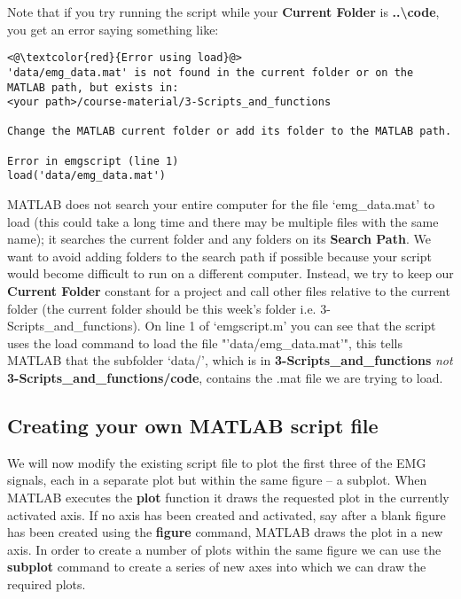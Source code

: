 \documentclass[12pt,a4paper]{article}
\begin{document}
Note that if you try running the script while your \textbf{Current Folder} is \textbf{..\textbackslash code}, you get an error saying something like:

\begin{lstlisting}[style=Matlab-editor]
<@\textcolor{red}{Error using load}@>
'data/emg_data.mat' is not found in the current folder or on the MATLAB path, but exists in:
<your path>/course-material/3-Scripts_and_functions

Change the MATLAB current folder or add its folder to the MATLAB path.

Error in emgscript (line 1)
load('data/emg_data.mat')
\end{lstlisting}

MATLAB does not search your entire computer for the file `emg\_data.mat' to load (this could take a long time and there may be multiple files with the same name); it searches the current folder and any folders on its \textbf{Search Path}.
We want to avoid adding folders to the search path if possible because your script would become difficult to run on a different computer.
Instead, we try to keep our \textbf{Current Folder} constant for a project and call other files relative to the current folder (the current folder should be this week's folder i.e. 3-Scripts\_and\_functions).
On line 1 of `emgscript.m' you can see that the script uses the load command to load the file "'data/emg_data.mat'", this tells MATLAB that the subfolder `data/', which is in \textbf{3-Scripts\_and\_functions} \emph{not} \textbf{3-Scripts\_and\_functions/code}, contains the .mat file we are trying to load.


\subsection{Creating your own MATLAB script file}
\label{sec:script}
We will now modify the existing script file to plot the first three of the EMG signals, each in a separate plot but within the same figure – a subplot.  
When MATLAB executes the \textbf{plot} function it draws the requested plot in the currently activated axis.  
If no axis has been created and activated, say after a blank figure has been created using the \textbf{figure} command, MATLAB draws the plot in a new axis.  
In order to create a number of plots within the same figure we can use the \textbf{subplot} command to create a series of new axes into which we can draw the required plots. %
\end{document}
